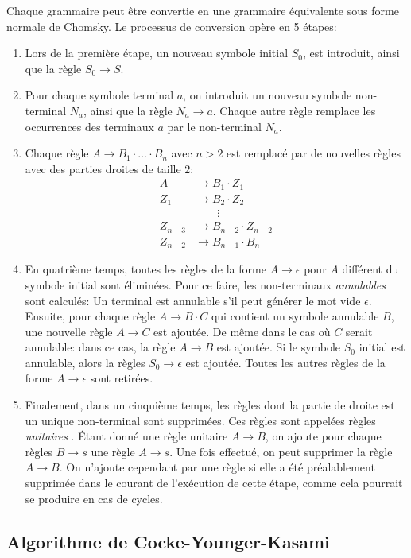 Chaque grammaire peut être convertie en une grammaire équivalente sous forme normale de Chomsky.
Le processus de conversion opère en 5 étapes:
\begin{enumerate}
\item Lors de la première étape, un nouveau symbole initial $S_0$, est introduit, ainsi que la règle $S_0 \to S$.
\item Pour chaque symbole terminal $a$, on introduit un nouveau symbole non-terminal $N_a$, ainsi que la règle $N_a \to a$.
Chaque autre règle remplace les occurrences des terminaux $a$ par le non-terminal $N_a$.
\item Chaque règle $A \to B_1 \cdot \ldots \cdot B_n$ avec $n > 2$ est remplacé par de nouvelles règles avec des parties droites de taille $2$:
\begin{align*}
A &\to B_1 \cdot Z_1\\
Z_1 &\to B_2 \cdot Z_2\\
&\hspace{2em} \vdots\\
Z_{n - 3} &\to B_{n - 2} \cdot Z_{n - 2}\\
Z_{n - 2} &\to B_{n - 1} \cdot B_n
\end{align*}
\item En quatrième temps, toutes les règles de la forme $A \to \epsilon$ pour $A$ différent du symbole initial sont éliminées.
Pour ce faire, les non-terminaux \og \textit{annulables} \fg{} sont calculés: Un terminal est annulable s'il peut générer le mot vide $\epsilon$.
Ensuite, pour chaque règle $A \to B \cdot C$ qui contient un symbole annulable $B$, une nouvelle règle $A \to C$ est ajoutée.
De même dans le cas où $C$ serait annulable: dans ce cas, la règle $A \to B$ est ajoutée.
Si le symbole $S_0$ initial est annulable, alors la règles $S_0 \to \epsilon$ est ajoutée.
Toutes les autres règles de la forme $A \to \epsilon$ sont retirées.
\item
Finalement, dans un cinquième temps, les règles dont la partie de droite est un unique non-terminal sont supprimées.
Ces règles sont appelées règles \og \textit{unitaires} \fg{}.
Étant donné une règle unitaire $A \to B$, on ajoute pour chaque règles $B \to s$ une règle $A \to s$. Une fois effectué, on peut supprimer la règle $A \to B$. On n'ajoute cependant par une règle si elle a été préalablement supprimée dans le courant de l'exécution de cette étape, comme cela pourrait se produire en cas de cycles. 	 
\end{enumerate}

\subsection{Algorithme de Cocke-Younger-Kasami}

